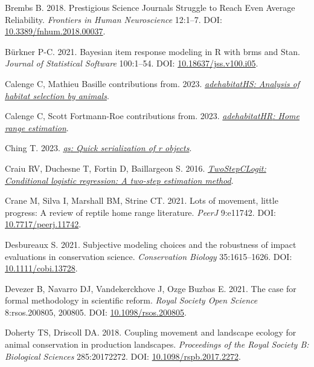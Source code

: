 \documentclass[10pt,a4paper]{article}
\newlength{\cslhangindent}
\newenvironment{CSLReferences}[2] %
 {\begin{list}{}{%
  \setlength{\itemindent}{0pt}
  \setlength{\leftmargin}{0pt}
  \setlength{\parsep}{0pt}
  \ifodd #1
   \setlength{\leftmargin}{\cslhangindent}
   \setlength{\itemindent}{-1\cslhangindent}
  \fi
  \setlength{\itemsep}{#2\baselineskip}}}
 {\end{list}}
\begin{document}
\begin{CSLReferences}{1}{0}
Brembs B. 2018. Prestigious {Science} {Journals} {Struggle} to {Reach} {Even} {Average} {Reliability}. \emph{Frontiers in Human Neuroscience} 12:1--7. DOI: \href{https://doi.org/10.3389/fnhum.2018.00037}{10.3389/fnhum.2018.00037}.

Bürkner P-C. 2021. Bayesian item response modeling in {R} with {brms} and {Stan}. \emph{Journal of Statistical Software} 100:1--54. DOI: \href{https://doi.org/10.18637/jss.v100.i05}{10.18637/jss.v100.i05}.

Calenge C, Mathieu Basille contributions from. 2023. \emph{\href{https://CRAN.R-project.org/package=adehabitatHS}{{adehabitatHS}: Analysis of habitat selection by animals}}.

Calenge C, Scott Fortmann-Roe contributions from. 2023. \emph{\href{https://CRAN.R-project.org/package=adehabitatHR}{{adehabitatHR}: Home range estimation}}.

Ching T. 2023. \emph{\href{https://CRAN.R-project.org/package=qs}{{qs}: Quick serialization of r objects}}.

Craiu RV, Duchesne T, Fortin D, Baillargeon S. 2016. \emph{\href{https://CRAN.R-project.org/package=TwoStepCLogit}{TwoStepCLogit: Conditional logistic regression: A two-step estimation method}}.

Crane M, Silva I, Marshall BM, Strine CT. 2021. Lots of movement, little progress: A review of reptile home range literature. \emph{PeerJ} 9:e11742. DOI: \href{https://doi.org/10.7717/peerj.11742}{10.7717/peerj.11742}.

Desbureaux S. 2021. Subjective modeling choices and the robustness of impact evaluations in conservation science. \emph{Conservation Biology} 35:1615--1626. DOI: \href{https://doi.org/10.1111/cobi.13728}{10.1111/cobi.13728}.

Devezer B, Navarro DJ, Vandekerckhove J, Ozge Buzbas E. 2021. The case for formal methodology in scientific reform. \emph{Royal Society Open Science} 8:rsos.200805, 200805. DOI: \href{https://doi.org/10.1098/rsos.200805}{10.1098/rsos.200805}.

Doherty TS, Driscoll DA. 2018. Coupling movement and landscape ecology for animal conservation in production landscapes. \emph{Proceedings of the Royal Society B: Biological Sciences} 285:20172272. DOI: \href{https://doi.org/10.1098/rspb.2017.2272}{10.1098/rspb.2017.2272}.


\end{CSLReferences}
\end{document}
